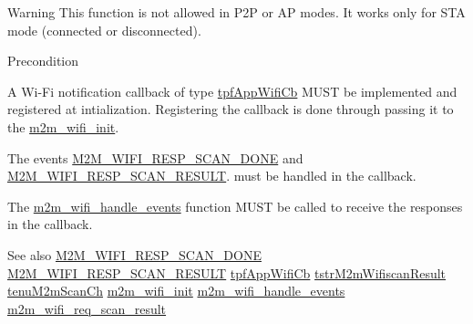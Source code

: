 \begin{DoxyWarning}{Warning}
This function is not allowed in P2P or AP modes. It works only for S\+TA mode (connected or disconnected).
\end{DoxyWarning}
\begin{DoxyPrecond}{Precondition}

\begin{DoxyItemize}
\item A Wi-\/\+Fi notification callback of type \hyperlink{group__WlanEnums_gac5302f32839285fe8375c159087aa8a1}{tpf\+App\+Wifi\+Cb} M\+U\+ST be implemented and registered at intialization. Registering the callback is done through passing it to the \hyperlink{group__WifiInitFn_ga73c734812e844d96d860c4e93e9daf35}{m2m\+\_\+wifi\+\_\+init}.
\item The events \hyperlink{group__WlanEnums_gga064de09dec1d5e88ed8d075fa40f57dead835febbe18b7e3cc6ce4693951354fe}{M2\+M\+\_\+\+W\+I\+F\+I\+\_\+\+R\+E\+S\+P\+\_\+\+S\+C\+A\+N\+\_\+\+D\+O\+NE} and \hyperlink{group__WlanEnums_gga064de09dec1d5e88ed8d075fa40f57deadfb48e88c3a8e5f9dac634d62d3f53e5}{M2\+M\+\_\+\+W\+I\+F\+I\+\_\+\+R\+E\+S\+P\+\_\+\+S\+C\+A\+N\+\_\+\+R\+E\+S\+U\+LT}. must be handled in the callback.
\item The \hyperlink{group__WifiHandleEventsFn_ga461a4edc057cec8c00cf124a07aa3b02}{m2m\+\_\+wifi\+\_\+handle\+\_\+events} function M\+U\+ST be called to receive the responses in the callback.
\end{DoxyItemize}
\end{DoxyPrecond}
\begin{DoxySeeAlso}{See also}
\hyperlink{group__WlanEnums_gga064de09dec1d5e88ed8d075fa40f57dead835febbe18b7e3cc6ce4693951354fe}{M2\+M\+\_\+\+W\+I\+F\+I\+\_\+\+R\+E\+S\+P\+\_\+\+S\+C\+A\+N\+\_\+\+D\+O\+NE} \hyperlink{group__WlanEnums_gga064de09dec1d5e88ed8d075fa40f57deadfb48e88c3a8e5f9dac634d62d3f53e5}{M2\+M\+\_\+\+W\+I\+F\+I\+\_\+\+R\+E\+S\+P\+\_\+\+S\+C\+A\+N\+\_\+\+R\+E\+S\+U\+LT} \hyperlink{group__WlanEnums_gac5302f32839285fe8375c159087aa8a1}{tpf\+App\+Wifi\+Cb} \hyperlink{structtstrM2mWifiscanResult}{tstr\+M2m\+Wifiscan\+Result} \hyperlink{group__WlanEnums_ga2a91dd671e2672dba1a7ed45230f3a99}{tenu\+M2m\+Scan\+Ch} \hyperlink{group__WifiInitFn_ga73c734812e844d96d860c4e93e9daf35}{m2m\+\_\+wifi\+\_\+init} \hyperlink{group__WifiHandleEventsFn_ga461a4edc057cec8c00cf124a07aa3b02}{m2m\+\_\+wifi\+\_\+handle\+\_\+events} \hyperlink{group__WifiReqScanResult_ga2585ee08ee8ecac67155ec99dd4d0863}{m2m\+\_\+wifi\+\_\+req\+\_\+scan\+\_\+result}
\end{DoxySeeAlso}
